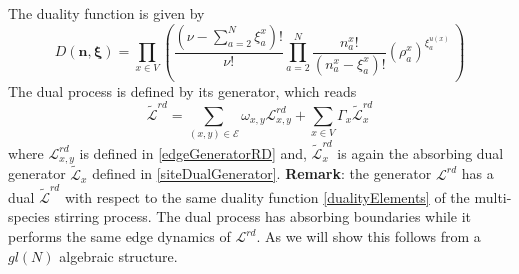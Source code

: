 \documentclass[10pt]{article}
\numberwithin{equation}{section}
\numberwithin{equation}{subsection}
\begin{document}
The duality function is given by
\begin{equation}
	D(\bm{n},\bm{\xi})=\prod_{x\in V}\left(\frac{(\nu -\sum_{a=2}^{N}\xi_{a}^{x})!}{\nu!}\prod_{a=2}^{N}\frac{n_{a}^{x}!}{(n_{a}^{x}-\xi_{a}^{x})!}\left(\rho_{a}^{x}\right)^{\xi_{a}^{u(x)}}\,\right)
\end{equation}
The dual process is defined by its generator, which reads
\begin{equation}\label{DualGeneratorRD}
	\widetilde{\mathcal{L}}^{rd}=\sum_{(x,y)\in \mathcal{E}}\omega_{x,y}\mathcal{L}_{x,y}^{rd}+\sum_{x\in V}\Gamma_{x}\widetilde{\mathcal{L}}_{x}^{rd}
\end{equation}
where 
$\mathcal{L}_{x,y}^{rd}$ is defined in \eqref{edgeGeneratorRD} and, $\widetilde{\mathcal{L}}_{x}^{rd}$ is again the absorbing dual generator $\widetilde{\mathcal{L}}_{x}$ defined in \eqref{siteDualGenerator}. 
\newline
\newline
\textbf{Remark}: the generator $\mathcal{L}^{rd}$ has a dual $\widetilde{\mathcal{L}}^{rd}$ with respect to the same duality function \eqref{dualityElements} of the multi-species stirring process. The dual process has absorbing boundaries while it performs the same edge dynamics of $\mathcal{L}^{rd}$. As we will show this follows from a $gl(N)$ algebraic structure. 
\end{document}
